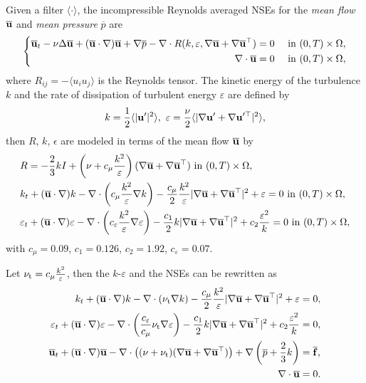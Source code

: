 \documentclass[oneside,11pt]{book}
\numberwithin{equation}{section}
\begin{document}
Given a filter $\langle\cdot\rangle$, the incompressible Reynolds averaged NSEs for the \textit{mean flow} $\overline{\bf u}$ and \textit{mean pressure} $\overline{p}$ are
\begin{equation}
    \left\{\begin{split}
        \overline{\bf u}_t - \nu\Delta \overline{\bf u} + (\overline{\bf u}\cdot\nabla)\overline{\bf u} + \nabla \overline{p} - \nabla\cdot R(k,\varepsilon,\nabla \overline{\bf u} + \nabla \overline{\bf u}^\top) &= 0 &&\mbox{ in } (0,T)\times\Omega,\\
        \nabla\cdot \overline{\bf u} &= 0 &&\mbox{ in } (0,T)\times\Omega,
    \end{split}\right.
\end{equation}
where $R_{ij} = -\langle u_iu_j\rangle$ is the Reynolds tensor. The kinetic energy of the turbulence $k$ and the rate of dissipation of turbulent energy $\varepsilon$ are defined by
\begin{align}
    k = \frac{1}{2}\langle|{\bf u}'|^2\rangle,\ \varepsilon = \frac{\nu}{2}\langle|\nabla{\bf u}' + \nabla{\bf u}'^\top|^2\rangle,
\end{align}
then $R$, $k$, $\epsilon$ are modeled in terms of the mean flow $\overline{\bf u}$ by
\begin{align}
    &R = -\frac{2}{3}kI + \left(\nu + c_\mu\frac{k^2}{\varepsilon}\right)(\nabla \overline{\bf u} + \nabla \overline{\bf u}^\top) \mbox{ in } (0,T)\times\Omega,\\
    &k_t + (\overline{\bf u}\cdot\nabla)k - \nabla\cdot\left(c_\mu\frac{k^2}{\varepsilon}\nabla k\right) - \frac{c_\mu}{2}\frac{k^2}{\varepsilon}|\nabla \overline{\bf u} + \nabla \overline{\bf u}^\top|^2 + \varepsilon = 0 \mbox{ in } (0,T)\times\Omega,\\
    &\varepsilon_t + (\overline{\bf u}\cdot\nabla)\varepsilon - \nabla\cdot\left(c_\varepsilon\frac{k^2}{\varepsilon}\nabla\varepsilon\right) - \frac{c_1}{2}k|\nabla \overline{\bf u} + \nabla \overline{\bf u}^\top|^2 + c_2\frac{\varepsilon^2}{k} = 0 \mbox{ in } (0,T)\times\Omega,
\end{align}
with $c_\mu = 0.09$, $c_1 = 0.126$, $c_2 = 1.92$, $c_\varepsilon = 0.07$.

Let $\nu_{\rm t} = c_\mu\frac{k^2}{\varepsilon}$, then the $k$-$\varepsilon$ and the NSEs can be rewritten as
\begin{align}
    k_t + (\overline{\bf u}\cdot\nabla)k - \nabla\cdot(\nu_{\rm t}\nabla k) - \frac{c_\mu}{2}\frac{k^2}{\varepsilon}|\nabla \overline{\bf u} + \nabla \overline{\bf u}^\top|^2 + \varepsilon &= 0,\\
    \varepsilon_t + (\overline{\bf u}\cdot\nabla)\varepsilon - \nabla\cdot\left(\frac{c_\varepsilon}{c_\mu}\nu_{\rm t}\nabla\varepsilon\right) - \frac{c_1}{2}k|\nabla \overline{\bf u} + \nabla \overline{\bf u}^\top|^2 + c_2\frac{\varepsilon^2}{k} &= 0,\\
    \overline{\bf u}_t + (\overline{\bf u}\cdot\nabla)\overline{\bf u} - \nabla\cdot\left((\nu + \nu_{\rm t})(\nabla \overline{\bf u} + \nabla \overline{\bf u}^\top)\right) + \nabla\left(\overline{p} + \frac{2}{3}k\right) &= \overline{\bf f},\\
    \nabla\cdot \overline{\bf u} &= 0.
\end{align}
\end{document}
